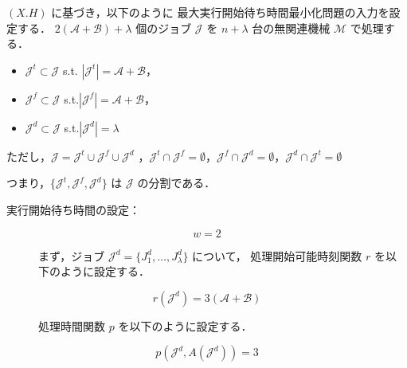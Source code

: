 \documentclass[12pt]{optlab-bachelor}
\begin{document}
$(X.H)$ に基づき，以下のように 最大実行開始待ち時間最小化問題の入力を設定する．
$2(\mathcal{A} + \mathcal{B}) + \lambda$ 個のジョブ $\mathcal{J}$ を
$n + \lambda$ 台の無関連機械 $\mathcal{M}$ で処理する．
\begin{itemize}
  \item $\mathcal{J}^t \subset \mathcal{J}$ s.t. $|\mathcal{J}^t| =
  \mathcal{A}  + \mathcal{B}$，
  \item $\mathcal{J}^f \subset \mathcal{J}$
  s.t.$|\mathcal{J}^f| = \mathcal{A}  + \mathcal{B}$，
  \item $\mathcal{J}^d \subset \mathcal{J}$ s.t.$|\mathcal{J}^d| =
  \lambda$
\end{itemize}
ただし，$\mathcal{J} = \mathcal{J}^t \cup \mathcal{J}^f \cup
\mathcal{J}^d$ ，$\mathcal{J}^t \cap \mathcal{J}^f = \emptyset$，$\mathcal{J}^f \cap \mathcal{J}^d = \emptyset$，$\mathcal{J}^d \cap \mathcal{J}^t = \emptyset$

つまり，$\{\mathcal{J}^t, \mathcal{J}^f,\mathcal{J}^d\}$ は $\mathcal{J}$ の分割である．

\begin{description}
  \item[実行開始待ち時間の設定：]
\end{description}
$$w = 2$$
\begin{description}
  \item[] まず，ジョブ $\mathcal{J}^d = \{J^d_1,\ldots,J^d_{\lambda}\}$ について，
  処理開始可能時刻関数 $r$ を以下のように設定する．
\end{description}
$$r(\mathcal{J}^d) = 3(\mathcal{A} + \mathcal{B})$$
\begin{description}
  \item[] 処理時間関数 $p$ を以下のように設定する．
\end{description}
$$p(\mathcal{J}^d, A(\mathcal{J}^d)) = 3$$
\end{document}
